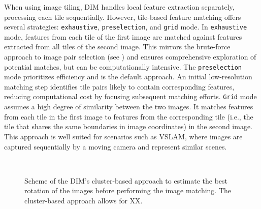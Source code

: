 When using image tiling, DIM handles local feature extraction separately, processing each tile sequentially. 
However, tile-based feature matching offers several strategies: \texttt{exhaustive}, \texttt{preselection}, and \texttt{grid} mode.
In \texttt{exhaustive} mode, features from each tile of the first image are matched against features extracted from all tiles of the second image. 
This mirrors the brute-force approach to image pair selection (see ) and ensures comprehensive exploration of potential matches, but can be computationally intensive. 
The \texttt{preselection} mode prioritizes efficiency and is the default approach. 
An initial low-resolution matching step identifies tile pairs likely to contain corresponding features, reducing computational cost by focusing subsequent matching efforts. 
\texttt{Grid} mode assumes a high degree of similarity between the two images. 
It matches features from each tile in the first image to features from the corresponding tile (i.e., the tile that shares the same boundaries in image coordinates) in the second image. 
This approach is well suited for scenarios such as VSLAM, where images are captured sequentially by a moving camera and represent similar scenes. 

\begin{figure}[hb!]
  \centering
   \\
  \caption{Scheme of the DIM's cluster-based approach to estimate the best rotation of the images before performing the image matching. 
    The cluster-based approach allows for XX.
  }
  \label{fig:5:dim_rotations}
\end{figure}

